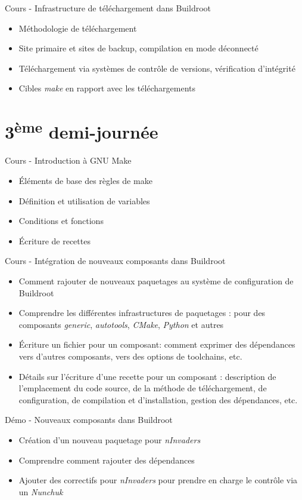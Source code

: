 \documentclass[a4paper,12pt,obeyspaces,spaces,hyphens]{article}
\begin{document}
\feagendaonecolumn
{Cours - Infrastructure de téléchargement dans Buildroot}
{
  \begin{itemize}
  \item Méthodologie de téléchargement
  \item Site primaire et sites de backup, compilation en mode déconnecté
  \item Téléchargement via systèmes de contrôle de versions,
	vérification d'intégrité
  \item Cibles {\em make} en rapport avec les téléchargements
  \end{itemize}
}

\section{3\textsuperscript{ème} demi-journée}

\feagendaonecolumn
{Cours - Introduction à GNU Make}
{
  \begin{itemize}
  \item Éléments de base des règles de make
  \item Définition et utilisation de variables
  \item Conditions et fonctions
  \item Écriture de recettes
  \end{itemize}
}

\feagendatwocolumn
{Cours - Intégration de nouveaux composants dans Buildroot}
{
  \begin{itemize}
  \item Comment rajouter de nouveaux paquetages au système de
	configuration de Buildroot
  \item Comprendre les différentes infrastructures de paquetages : pour
	des composants {\em generic}, {\em autotools}, {\em CMake}, {\em
	Python} et autres
  \item Écriture un fichier  pour un composant: comment
    exprimer des dépendances vers d'autres composants, vers des options
    de toolchains, etc.
  \item Détails sur l'écriture d'une recette pour un composant :
	description de l'emplacement du code source, de la méthode de
	téléchargement, de configuration, de compilation et
	d'installation, gestion des dépendances, etc.
  \end{itemize}
}
{Démo - Nouveaux composants dans Buildroot}
{
  \begin{itemize}
  \item Création d'un nouveau paquetage pour {\em nInvaders}
  \item Comprendre comment rajouter des dépendances
  \item Ajouter des correctifs pour {\em nInvaders} pour prendre en
	charge le contrôle via un {\em Nunchuk}
  \end{itemize}
}
\end{document}
